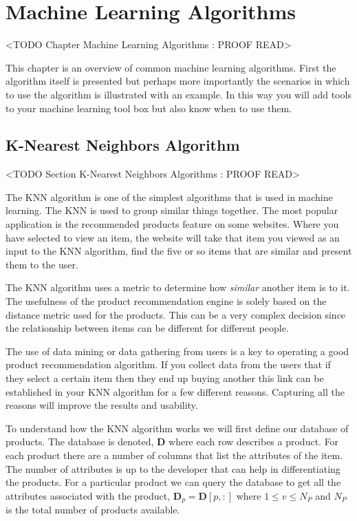 \chapter{Machine Learning Algorithms}
	<TODO Chapter Machine Learning Algorithms : PROOF READ>
	
This chapter is an overview of common machine learning algorithms. First the algorithm itself is presented but perhaps more importantly the scenarios in which to use the algorithm is illustrated with an example. In this way you will add tools to your machine learning tool box but also know when to use them. 

\section{K-Nearest Neighbors Algorithm}
	<TODO Section K-Nearest Neighbors Algorithms : PROOF READ>
	
The \ac{KNN} algorithm is one of the simplest algorithms that is used in machine learning. The \ac{KNN} is used to group similar things together. The most popular application is the recommended products feature on some websites. Where you have selected to view an item, the website will take that item you viewed as an input to the \ac{KNN} algorithm, find the five or so items that are similar and present them to the user.

The \ac{KNN} algorithm uses a metric to determine how \emph{similar} another item is to it. The usefulness of the product recommendation engine is solely based on the distance metric used for the products. This can be a very complex decision since the relationship between items can be different for different people. 

The use of data mining or data gathering from users is a key to operating a good product recommendation algorithm. If you collect data from the users that if they select a certain item then they end up buying another this link can be established in your \ac{KNN} algorithm for a few different reasons. Capturing all the reasons will improve the results and usability.

To understand how the \ac{KNN} algorithm works we will first define our database of products. The database is denoted, $\mathbf{D}$ where each row describes a product. For each product there are a number of columns that list the attributes of the item. The number of attributes is up to the developer that can help in differentiating the products. For a particular product we can query the database to get all the attributes associated with the product, $\mathbf{D}_p = \mathbf{D}[p,:]$ where $1 \leq v \leq N_P$ and $N_P$ is the total number of products available.  

